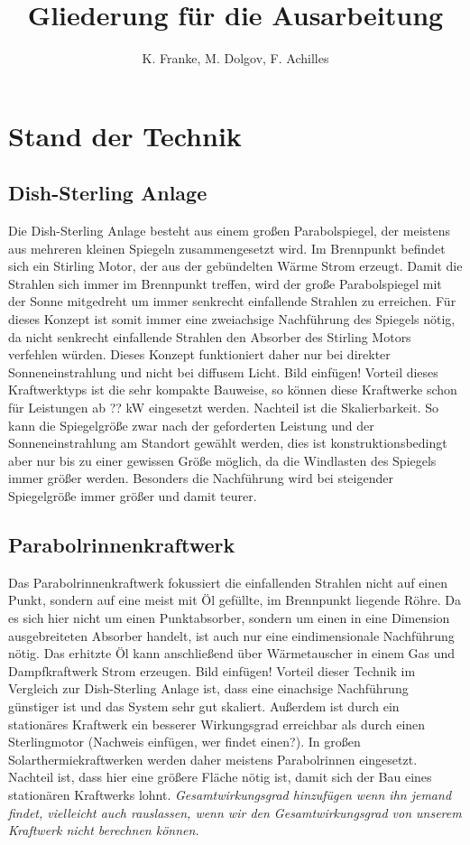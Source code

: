 \documentclass[fontsize=10pt,paper=a4,bibliography=totoc]{scrartcl}
\title{Gliederung für die Ausarbeitung}
\author{K. Franke, M. Dolgov, F. Achilles}
\begin{document}
\maketitle

\section{Stand der Technik}
\subsection{Dish-Sterling Anlage}
Die Dish-Sterling Anlage besteht aus einem großen Parabolspiegel, der meistens aus mehreren kleinen Spiegeln zusammengesetzt wird. Im Brennpunkt befindet sich ein Stirling Motor, der aus der gebündelten Wärme Strom erzeugt. Damit die Strahlen sich immer im Brennpunkt treffen, wird der große Parabolspiegel mit der Sonne mitgedreht um immer senkrecht einfallende Strahlen zu erreichen. Für dieses Konzept ist somit immer eine zweiachsige Nachführung des Spiegels nötig, da nicht senkrecht einfallende Strahlen den Absorber des Stirling Motors verfehlen würden. Dieses Konzept funktioniert daher nur bei direkter Sonneneinstrahlung und nicht bei diffusem Licht. Bild einfügen! Vorteil dieses Kraftwerktyps ist die sehr kompakte Bauweise, so können diese Kraftwerke schon für Leistungen ab ?? kW eingesetzt werden. Nachteil ist die Skalierbarkeit. So kann die Spiegelgröße zwar nach der geforderten Leistung und der Sonneneinstrahlung am Standort gewählt werden, dies ist konstruktionsbedingt aber nur bis zu einer gewissen Größe möglich, da die Windlasten des Spiegels immer größer werden. Besonders die Nachführung wird bei steigender Spiegelgröße immer größer und damit teurer. 
\subsection{Parabolrinnenkraftwerk}
Das Parabolrinnenkraftwerk fokussiert die einfallenden Strahlen nicht auf einen Punkt, sondern auf eine meist mit Öl gefüllte, im Brennpunkt liegende Röhre. Da es sich hier nicht um einen Punktabsorber, sondern um einen in eine Dimension ausgebreiteten Absorber handelt, ist auch nur eine eindimensionale Nachführung nötig. Das erhitzte Öl kann anschließend über Wärmetauscher in einem Gas und Dampfkraftwerk Strom erzeugen. Bild einfügen! Vorteil dieser Technik im Vergleich zur Dish-Sterling Anlage ist, dass eine einachsige Nachführung günstiger ist und das System sehr gut skaliert. Außerdem ist durch ein stationäres Kraftwerk ein besserer Wirkungsgrad erreichbar als durch einen Sterlingmotor (Nachweis einfügen, wer findet einen?). In großen Solarthermiekraftwerken werden daher meistens Parabolrinnen eingesetzt. Nachteil ist, dass hier eine größere Fläche nötig ist, damit sich der Bau eines stationären Kraftwerks lohnt.
\emph{Gesamtwirkungsgrad hinzufügen wenn ihn jemand findet, vielleicht auch rauslassen, wenn wir den Gesamtwirkungsgrad von unserem Kraftwerk nicht berechnen können.}
\end{document}
